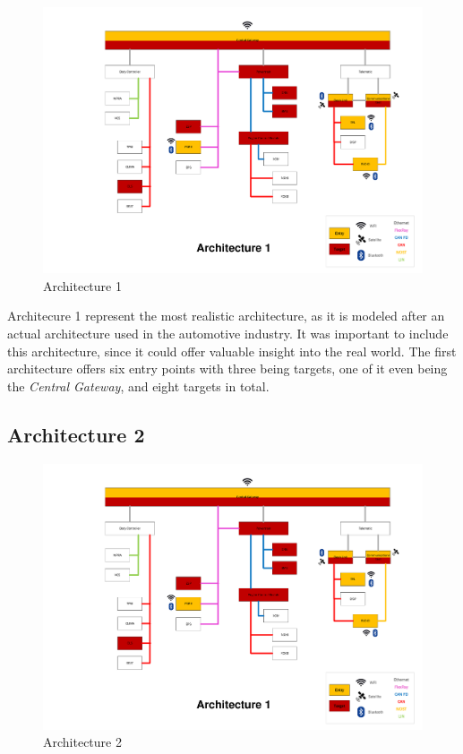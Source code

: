 \begin{figure}[h!]
    \caption{Architecture 1}
    \includegraphics[width=\textwidth, page=1]{../Architectures-survey.pdf}
\end{figure}

Architecure 1 represent the most realistic architecture, as it is modeled after an actual architecture used in the automotive industry.
It was important to include this architecture, since it could offer valuable insight into the real world.
The first architecture offers six entry points with three being targets, one of it even being the \textit{Central Gateway}, and eight targets in total.
\par


\subsection{Architecture 2}
\label{subsec:arch2}	

\begin{figure}[h!]
    \caption{Architecture 2}
    \includegraphics[width=\textwidth, page=2]{../Architectures-survey.pdf}
\end{figure}

